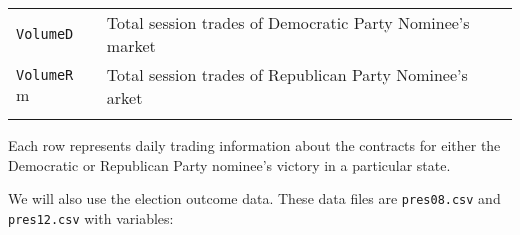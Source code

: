 \documentclass[]{article}
\begin{document}
\begin{longtable}[c]{@{}ll@{}}
\begin{minipage}[t]{0.24\columnwidth}
\texttt{VolumeD}
\end{minipage} & \begin{minipage}[t]{0.69\columnwidth}\raggedright
Total session trades of Democratic Party Nominee's market
\end{minipage}
\\\addlinespace
\begin{minipage}[t]{0.24\columnwidth}\raggedright
\texttt{VolumeR} m
\end{minipage} & \begin{minipage}[t]{0.69\columnwidth}\raggedright
Total session trades of Republican Party Nominee's arket
\end{minipage}
\\\addlinespace
\bottomrule
\end{longtable}

Each row represents daily trading information about the contracts for
either the Democratic or Republican Party nominee's victory in a
particular state.

We will also use the election outcome data. These data files are
\texttt{pres08.csv} and \texttt{pres12.csv} with variables:
\end{document}
